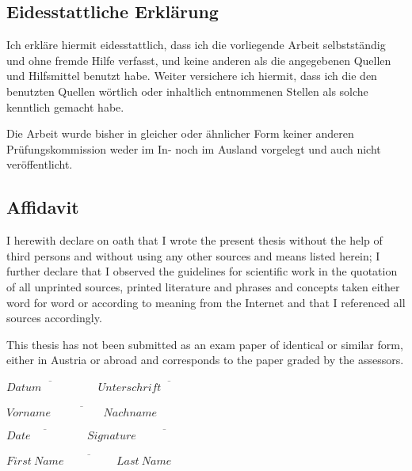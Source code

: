 
\ifmmtlanguagegerman
\subsection*{Eidesstattliche Erklärung}


Ich erkläre hiermit eidesstattlich, dass ich die vorliegende Arbeit selbstständig und ohne fremde Hilfe verfasst, und keine anderen als die angegebenen Quellen und Hilfsmittel benutzt habe. Weiter versichere ich hiermit, dass ich die den benutzten Quellen wörtlich oder inhaltlich entnommenen Stellen als solche kenntlich gemacht habe.

Die Arbeit wurde bisher in gleicher oder ähnlicher Form keiner anderen Prüfungskommission weder im In- noch im Ausland vorgelegt und auch nicht veröffentlicht.

\else

\subsection*{Affidavit}

I herewith declare on oath that I wrote the present thesis without the help of third persons and without using any other sources and means listed herein; I further declare that I observed the guidelines for scientific work in the quotation of all unprinted sources, printed literature and phrases and concepts taken either word for word or according to meaning from the Internet and that I referenced all sources accordingly.

This thesis has not been submitted as an exam paper of identical or similar form, either in Austria or abroad and corresponds to the paper graded by the assessors.

\fi

\vspace*{3cm}



\hfill

\ifmmtlanguagegerman
$\overline{Datum \hspace{2cm}}$ \hfill $\overline{{Unterschrift}\hspace{3cm}}$

\vspace*{1cm}

\hfill $\overline{{Vorname\hspace{2cm}Nachname}}$
 
 \else
 $\overline{Date \hspace{2cm}}$ \hfill $\overline{{Signature}\hspace{4cm}}$

\vspace*{1cm}

 \hfill $\overline{{First~Name\hspace{2cm}Last~Name}}$
 \fi

